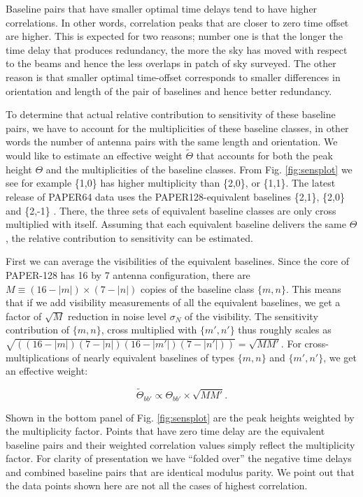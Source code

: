 \documentclass[twocolumn,apj,numberedappendix]{emulateapj}
\renewcommand\[{\begin{equation}}
\renewcommand\]{\end{equation}}
\begin{document}
Baseline pairs that have smaller optimal time delays
tend to have higher correlations. In other words, correlation peaks
that are closer to zero time offset are higher. This is expected for two reasons;
number one is that the longer the time delay that produces redundancy, the more the sky has moved with respect
to the beams and hence the less overlaps in patch of sky surveyed. The other reason is that smaller optimal
time-offset corresponds to smaller differences in orientation and length of the pair of baselines and hence better redundancy. 


To determine that actual relative contribution to sensitivity of these
baseline pairs, we have to account for the multiplicities of
these baseline classes, in other words the number of antenna pairs with the
same length and orientation. We would like to estimate an effective weight $\widetilde{\Theta}$ that accounts for both the peak height $\Theta$ and the multiplicities of the baseline classes. From Fig. \ref{fig:sensplot}
we see for example \{1,0\} has higher multiplicity than \{2,0\},
or \{1,1\}. The latest release of PAPER64 data uses the PAPER128-equivalent baselines \{2,1\},
\{2,0\} and \{2,-1\} \citep{Ali2015}. There, the three sets of equivalent baseline classes
are only cross multiplied with itself. Assuming that each equivalent baseline delivers
the same $\Theta$, the relative contribution to sensitivity can be estimated. 

First we can average the visibilities of the equivalent baselines. Since the core of PAPER-128 has 16 by 7 antenna configuration, there
are $M\equiv(16-|m|)\times(7-|n|)$ copies of the baseline class $\{m,n\}$. This means
that if we add visibility measurements of all the equivalent baselines,
we get a factor of $\sqrt{M}$ reduction in noise
level $\sigma_N$ of the visibility. The sensitivity contribution of $\{m,n\}$, cross multiplied with $\{m',n'\}$  thus roughly scales as $\sqrt{\left((16-|m|)(7-|n|)(16-|m'|)(7-|n'|)\right)}=\sqrt{MM'}$.
For cross-multiplications of nearly equivalent baselines of
types $\{m,n\}$ and $\{m',n'\}$, we get an effective weight: 

\begin{equation}
\widetilde{\Theta}_{bb'} \propto \Theta_{bb'}\times\sqrt{MM'}.\label{eq:sensul}
\end{equation}

Shown in the bottom panel of Fig. \ref{fig:sensplot} are the peak heights weighted
by the multiplicity factor. Points that have zero time delay are the equivalent baseline pairs and their weighted correlation values simply reflect the multiplicity factor. For clarity of presentation we have ``folded over'' the negative time delays and combined baseline pairs that are identical modulus parity. We point out that the data points shown here are not all the cases of highest correlation.  
\end{document}
